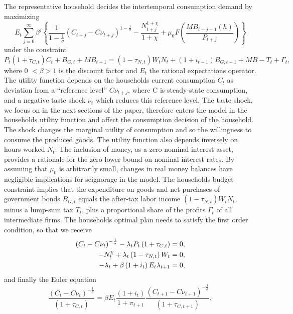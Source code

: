 \documentclass[12pt,a4paper,oneside,titlepage]{article}
\begin{document}
The representative household decides the intertemporal consumption demand by maximizing
\begin{equation}
E_t \sum_{j=0}^\infty \beta^j \left\{ \frac{1}{1- \frac{1}{\sigma}} \left(C_{t+j} - C\nu_{t+j}\right)^{1-\frac{1}{\sigma}} - \frac{N_{t+j}^{1+\chi}}{1+\chi} + \mu_0F \left(\frac{MB_{t+j+1}(h)}{P_{t+j}}\right)\right\} \nonumber
\end{equation}
under the constraint\newline
$P_t(1+\tau_{C,t})C_t + B_{G,t} + MB_{t+1} = (1-\tau_{N,t})W_tN_t + (1+i_{t-1})B_{G,t-1} + MB-T_t + \Gamma_t,$
where 0 $< \beta > 1$ is the discount factor and $E_t$ the rational expectations operator. The utility function depends on the households current consumption $C_t$ as deviation from a “reference level” $C\nu_{t+j}$, where C is steady-state consumption, and a negative taste shock $\nu_t$ which reduces this reference level. The taste shock, we focus on in the next sections of the paper, therefore enters the model in the households utility function and affect the consumption decision of the household. The shock changes the marginal utility of consumption and so the willingness to consume the produced goods.\newline
The utility function also depends inversely on hours worked $N_t$. The inclusion of money, as a zero nominal interest asset, provides a rationale for the zero lower bound on nominal interest rates. By assuming that $\mu_0$ is arbitrarily small, changes in real money balances have negligible implications for seignorage in the model. The households budget constraint implies that the expenditure on goods and net purchases of government bonds $B_{G,t}$ equals the after-tax labor income $ \left(1 - \tau_{N,t} \right) W_tN_t$, minus a lump-sum tax $T_t$, plus a proportional share of the profits $\Gamma_t$ of all intermediate firms. The households optimal plan needs to satisfy the first order condition, so that we receive
\begin{align}
\vspace{-0.5cm} \left(C_t - C\nu_t\right)^{-\frac{1}{\sigma}}  - \lambda_tP_t \left(1 + \tau_{C,t} \right) = 0,\nonumber\\
-N_t^{\chi} + \lambda_t \left(1 - \tau_{N,t} \right) W_t = 0,\nonumber\\
-\lambda_t + \beta \left(1 + i_t \right) E_t\lambda_{t+1} = 0,\nonumber
\end{align}
and finally the Euler equation
\begin{equation}
\frac {\left(C_t - C\nu_t\right)^{-\frac{1}{\sigma}}}{\left(1 + \tau_{C,t} \right)} = \beta E_t \frac{\left(1 + i_t \right)}{1 + \pi_{t+1}} \frac{\left(C_{t+1} - C\nu_{t+1}\right)^{-\frac{1}{\sigma}}}{\left(1+ \tau_{C,t+1}\right)},
\end{equation}
\end{document}
